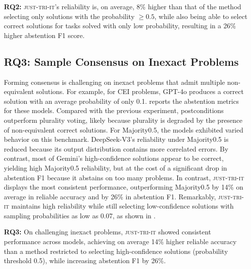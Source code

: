\documentclass[acmsmall,screen,nonacm]{acmart}
\newcommand{\toolName}{\textsc{just-tri-it}\xspace}
\begin{document}
\begin{tcolorbox}[colback=gray!5, colframe=black!20, arc=2pt, boxrule=0.3mm, breakable, sharp corners, left=2pt, right=2pt, top=2pt, bottom=2pt]
\textbf{RQ2:} \toolName's reliability is, on average, 8\% higher than that of the method selecting only solutions with the probability $\geq 0.5$, while also being able to select correct solutions for tasks solved with only low probability, resulting in a 26\% higher abstention F1 score.
\end{tcolorbox}

\subsection{RQ3: Sample Consensus on Inexact Problems}

Forming consensus is challenging on inexact problems that admit multiple non-equivalent solutions. For example, for CEI problems, GPT-4o produces a correct solution with an average probability of only 0.1.  reports the abstention metrics for these models. Compared with the previous experiment, postconditions outperform plurality voting, likely because plurality is degraded by the presence of non-equivalent correct solutions. For Majority0.5, the models exhibited varied behavior on this benchmark. DeepSeek-V3's reliability under Majority0.5 is reduced because its output distribution contains more correlated errors. By contrast, most of Gemini's high-confidence solutions appear to be correct, yielding high Majority0.5 reliability, but at the cost of a significant drop in abstention F1 because it abstains on too many problems. In contrast, \toolName displays the most consistent performance, outperforming Majority0.5 by 14\% on average in reliable accuracy and by 26\% in abstention F1. Remarkably, \toolName maintains high reliability while still selecting low-confidence solutions with sampling probabilities as low as 0.07, as shown in .



\begin{tcolorbox}[colback=gray!5, colframe=black!20, arc=2pt, boxrule=0.3mm, breakable, sharp corners, left=2pt, right=2pt, top=2pt, bottom=2pt]
\textbf{RQ3:} On challenging inexact problems, \toolName showed consistent performance across models, achieving on average 14\% higher reliable accuracy than a method restricted to selecting high-confidence solutions (probability threshold 0.5), while increasing abstention F1 by 26\%.
\end{tcolorbox}
\vspace{-4mm}
\end{document}
